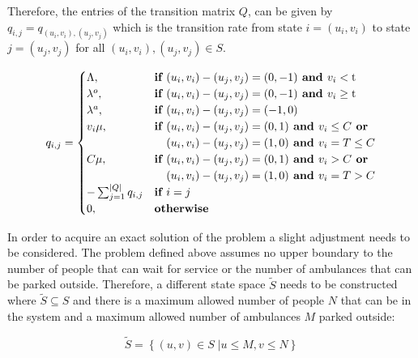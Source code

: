 Therefore, the entries of the transition matrix \(Q\), can be given by \( q_{i,j} = q_{(u_i, v_i),(u_j, v_j)} \) which is the transition rate from state \( i = (u_i, v_i) \) to state \( j = (u_j , v_j) \) for all \( (u_i, v_i), (u_j, v_j) \in S \).

\begin{equation} \label{eq:markov_transition_rate}
    q_{i, j} = 
    \begin{cases}
        \Lambda, & \textbf{if } (u_i, v_i) - (u_j, v_j) = (0,-1) \textbf{ and } v_i < \text{t} \\
        \lambda^o, & \textbf{if } (u_i, v_i) - (u_j, v_j) = (0,-1) \textbf{ and } v_i \geq \text{t} \\
        \lambda^a, & \textbf{if } (u_i, v_i) - (u_j, v_j) = (-1,0) \\
        v_i \mu, & \textbf{if } (u_i, v_i) - (u_j, v_j) = (0,1) \textbf{ and } v_i \leq C \textbf{ or} \\ & \hspace{0.37cm}(u_i, v_i) - (u_j, v_j) = (1,0) \textbf{ and } v_i = T \leq C \\
        C \mu, & \textbf{if } (u_i, v_i) - (u_j, v_j) = (0,1) \textbf{ and } v_i > C \textbf{ or} \\ & \hspace{0.37cm}(u_i, v_i) - (u_j, v_j) = (1,0) \textbf{ and } v_i = T > C\\
        -\sum_{j=1}^{|Q|}{q_{i,j}} & \textbf{if } i = j \\
        0, & \textbf{otherwise}
    \end{cases}
\end{equation}

In order to acquire an exact solution of the problem a slight adjustment needs to be considered. The problem defined above assumes no upper boundary to the number of people that can wait for service or the number of ambulances that can be parked outside. Therefore, a different state space \( \tilde S \) needs to be constructed where \( \tilde S \subseteq S \) and there is a maximum allowed number of people \( N \) that can be in the system and a maximum allowed number of ambulances \( M \) parked outside:

\begin{equation}
    \tilde S = \left\{ (u, v) \in S\;| u \leq M, v\leq N \right\}
\end{equation}


